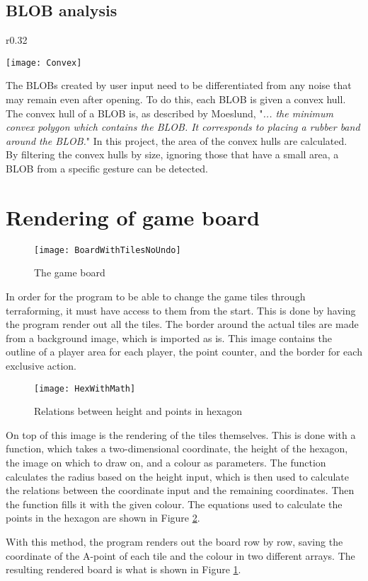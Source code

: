 \subsection{BLOB analysis}
\begin{wrapfigure}{r}{0.32\textwidth}
\begin{center}
\texttt{[image: Convex]}
\end{center}
\caption{The convex hull of a hand \label{Fig:Convex}}
\end{wrapfigure}
The BLOBs created by user input need to be differentiated from any noise that may remain even after opening. To do this, each BLOB is given a convex hull. The convex hull of a BLOB is, as described by Moeslund, "\textit{... the minimum convex polygon which contains the BLOB. It corresponds to placing a rubber band around the BLOB.}" \citep{moeslund_introduction_2012} In this project, the area of the convex hulls are calculated.  By filtering the convex hulls by size, ignoring those that have a small area, a BLOB from a specific gesture can be detected.

\section{Rendering of game board}
\begin{figure}[h!]
\centering \texttt{[image: BoardWithTilesNoUndo]}
\caption{The game board \label{Fig:Board}}
\end{figure}
In order for the program to be able to change the game tiles through terraforming, it must have access to them from the start. This is done by having the program render out all the tiles. The border around the actual tiles are made from a background image, which is imported as is. This image contains the outline of a player area for each player, the point counter, and the border for each exclusive action. 
\begin{figure}[h!]
\centering \texttt{[image: HexWithMath]}
\caption{Relations between height and points in hexagon \label{Fig:HexWithMath}}
\end{figure}

On top of this image is the rendering of the tiles themselves. This is done with a function, which takes a two-dimensional coordinate, the height of the hexagon, the image on which to draw on, and a colour as parameters. The function calculates the radius based on the height input, which is then used to calculate the relations between the coordinate input and the remaining coordinates. Then the function fills it with the given colour. The equations used to calculate the points in the hexagon are shown in Figure \ref{Fig:HexWithMath}.

With this method, the program renders out the board row by row, saving the coordinate of the A-point of each tile and the colour in two different arrays. The resulting rendered board is what is shown in Figure \ref{Fig:Board}.